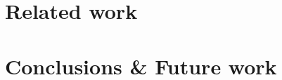 \documentclass[11pt, a4paper, twocolumn]{article}
\begin{document}
\section{Related work}


\section{Conclusions \& Future work}




\nocite{*}

\end{document}
